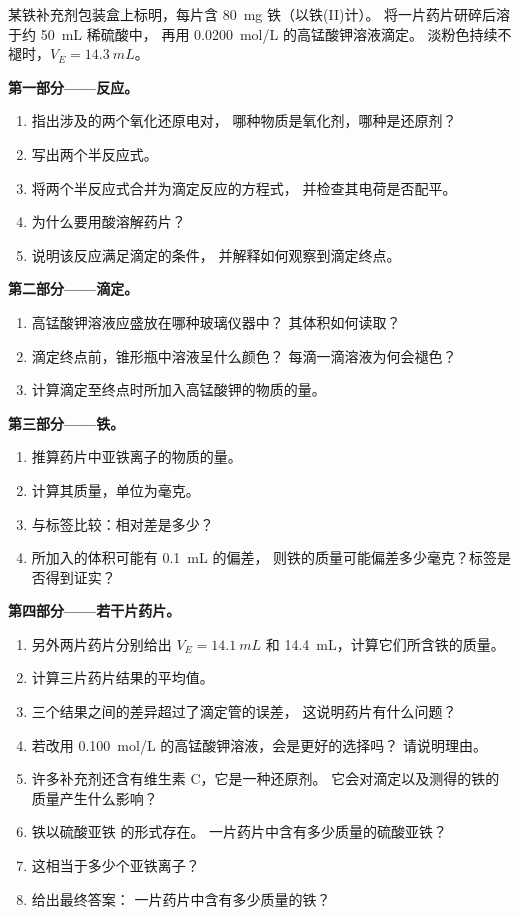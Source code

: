 \begin{problem}
\label{pb:g11:titration:1}
某铁补充剂包装盒上标明，每片含 \qty{80}{mg} 铁（以铁(II)计）。
将一片药片研碎后溶于约 \qty{50}{mL} 稀硫酸中，
再用 \qty{0.0200}{mol/L} 的高锰酸钾溶液滴定。
淡粉色持续不褪时，$V_E = \qty{14.3}{mL}$。

\medskip
\noindent\textbf{第一部分——反应。}
\begin{enumerate}
  \item 指出涉及的两个氧化还原电对，
        哪种物质是氧化剂，哪种是还原剂？
  \item 写出两个半反应式。
  \item 将两个半反应式合并为滴定反应的方程式，
        并检查其电荷是否配平。
  \item 为什么要用酸溶解药片？
  \item 说明该反应满足滴定的条件，
        并解释如何观察到滴定终点。
\end{enumerate}

\medskip
\noindent\textbf{第二部分——滴定。}
\begin{enumerate}[resume]
  \item 高锰酸钾溶液应盛放在哪种玻璃仪器中？
        其体积如何读取？
  \item 滴定终点前，锥形瓶中溶液呈什么颜色？
        每滴一滴溶液为何会褪色？
  \item 计算滴定至终点时所加入高锰酸钾的物质的量。
\end{enumerate}

\medskip
\noindent\textbf{第三部分——铁。}
\begin{enumerate}[resume]
  \item 推算药片中亚铁离子的物质的量。
  \item 计算其质量，单位为毫克。
  \item 与标签比较：相对差是多少？
  \item 所加入的体积可能有 \qty{0.1}{mL} 的偏差，
        则铁的质量可能偏差多少毫克？标签是否得到证实？
\end{enumerate}

\medskip
\noindent\textbf{第四部分——若干片药片。}
\begin{enumerate}[resume]
  \item 另外两片药片分别给出 $V_E = \qty{14.1}{mL}$ 和
        \qty{14.4}{mL}，计算它们所含铁的质量。
  \item 计算三片药片结果的平均值。
  \item 三个结果之间的差异超过了滴定管的误差，
        这说明药片有什么问题？
  \item 若改用 \qty{0.100}{mol/L} 的高锰酸钾溶液，会是更好的选择吗？
        请说明理由。
  \item 许多补充剂还含有维生素 C，它是一种还原剂。
        它会对滴定以及测得的铁的质量产生什么影响？
  \item 铁以硫酸亚铁  的形式存在。
        一片药片中含有多少质量的硫酸亚铁？
  \item 这相当于多少个亚铁离子？
  \item 给出最终答案：
        一片药片中含有多少质量的铁？
\end{enumerate}
\end{problem}
